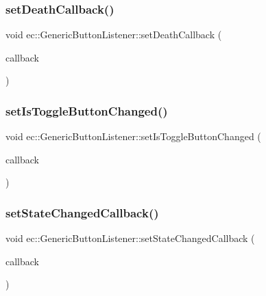 \subsubsection{\texorpdfstring{set\+Death\+Callback()}{setDeathCallback()}}
{\footnotesize\ttfamily void ec\+::\+Generic\+Button\+Listener\+::set\+Death\+Callback (\begin{DoxyParamCaption}\item[{const \mbox{\hyperlink{classec_1_1_generic_button_listener_aa7ca8b30098ab89eff663950d25a13eb}{Death\+\_\+\+Callback}} \&}]{callback }\end{DoxyParamCaption})}

\mbox{\label{classec_1_1_generic_button_listener_a7fc06552479c6ec92ec2d2cb07f66910}} 
\subsubsection{\texorpdfstring{set\+Is\+Toggle\+Button\+Changed()}{setIsToggleButtonChanged()}}
{\footnotesize\ttfamily void ec\+::\+Generic\+Button\+Listener\+::set\+Is\+Toggle\+Button\+Changed (\begin{DoxyParamCaption}\item[{const \mbox{\hyperlink{classec_1_1_generic_button_listener_a7830a9f92b6e68acbbf5237d2154db95}{Is\+Toggle\+Button\+Changed\+\_\+\+Callback}} \&}]{callback }\end{DoxyParamCaption})}

\mbox{\label{classec_1_1_generic_button_listener_ae0c80aab630fff656c387b5a2d42c3ec}} 
\subsubsection{\texorpdfstring{set\+State\+Changed\+Callback()}{setStateChangedCallback()}}
{\footnotesize\ttfamily void ec\+::\+Generic\+Button\+Listener\+::set\+State\+Changed\+Callback (\begin{DoxyParamCaption}\item[{const \mbox{\hyperlink{classec_1_1_generic_button_listener_a528d9bd01250d4e2d7179ad64d67a364}{Toggle\+State\+Changed\+\_\+\+Callback}} \&}]{callback }\end{DoxyParamCaption})}

